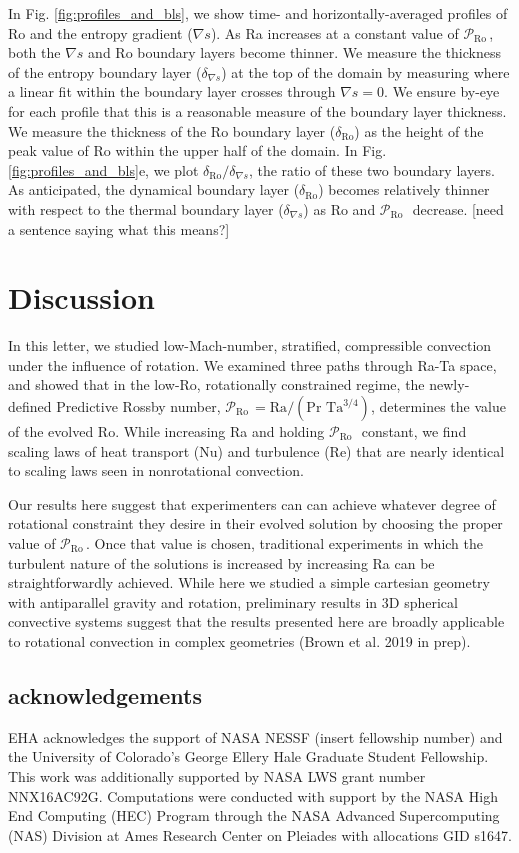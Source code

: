 \documentclass[twocolumn, amsmath, amsfonts, amssymb]{aastex62}
\newcommand{\grad}{\ensuremath{\nabla}}
\newcommand{\pro}{\ensuremath{\mathcal{P}_{\text{Ro}}\,}}
\begin{document}
In Fig. \ref{fig:profiles_and_bls}, we show time- and horizontally-averaged profiles of
Ro and the entropy gradient ($\grad s$). As Ra increases at a constant value of
\pro, both the $\grad s$ and Ro boundary layers become thinner. We measure the
thickness of the entropy boundary layer ($\delta_{\grad s}$) at the top of the domain by 
measuring where a linear fit within the boundary layer crosses through $\grad s = 0$.
We ensure by-eye for each profile that this is a reasonable measure of the boundary
layer thickness. We measure
the thickness of the Ro boundary layer ($\delta_{\text{Ro}}$) 
as the height of the peak value of Ro within the
upper half of the domain.
In Fig. \ref{fig:profiles_and_bls}e, we plot $\delta_{\text{Ro}}/\delta_{\grad s}$, the ratio
of these two boundary layers. As anticipated, the dynamical boundary layer ($\delta_{\text{Ro}}$)
becomes relatively thinner with respect to the thermal boundary layer ($\delta_{\grad s}$)
as Ro and \pro$\,$ decrease. [need a sentence saying what this means?]

\section{Discussion}
\label{sec:discussion}
In this letter, we studied low-Mach-number, stratified, compressible convection 
under the influence of rotation.
We examined three paths through Ra-Ta space, and showed that in the low-Ro, rotationally
constrained regime, the newly-defined 
Predictive Rossby number, $\pro = \text{Ra}/(\text{Pr }\text{Ta}^{3/4})$, determines the value of
the evolved Ro. While increasing Ra and holding \pro$\,$ constant,
we find scaling laws of heat transport (Nu) and turbulence (Re) that are nearly identical
to scaling laws seen in nonrotational convection.

Our results here suggest that experimenters can
can achieve whatever degree of rotational constraint they desire in their evolved solution
by choosing the proper value of \pro. Once that value is chosen, traditional experiments
in which the turbulent nature of the solutions is increased by increasing Ra can be 
straightforwardly achieved. While here we studied a simple cartesian geometry with antiparallel
gravity and rotation, preliminary results in 3D spherical convective systems suggest
that the results presented here are broadly applicable to rotational convection in
complex geometries (Brown et al. 2019 in prep).

\subsection{acknowledgements}
EHA acknowledges the support of NASA NESSF (insert fellowship number)
and the University of Colorado's George 
Ellery Hale Graduate Student Fellowship.
This work was additionally supported by  NASA LWS grant number NNX16AC92G.  
Computations were conducted 
with support by the NASA High End Computing (HEC) Program through the NASA 
Advanced Supercomputing (NAS) Division at Ames Research Center on Pleiades
with allocations GID s1647.

\newpage

\end{document}

